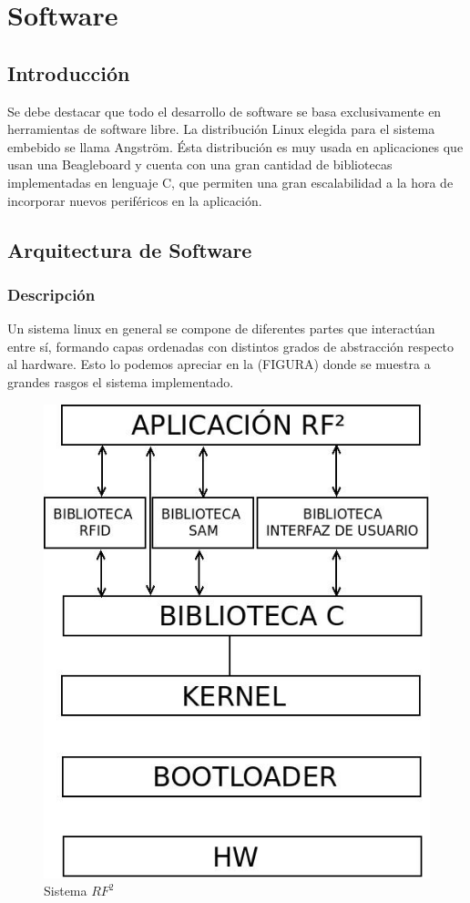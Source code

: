 \chapter{Software}

\section{Introducción}
Se debe destacar que todo el desarrollo de software se basa exclusivamente en herramientas de software libre. La distribución Linux elegida para el sistema embebido se llama Angström. Ésta distribución es muy usada en aplicaciones que usan una Beagleboard y cuenta con una gran cantidad de bibliotecas implementadas en lenguaje C, que permiten una gran escalabilidad a la hora de incorporar nuevos periféricos en la aplicación.

\section{Arquitectura de Software}
\subsection{Descripción}
Un sistema linux en general se compone de diferentes partes que interactúan entre sí, formando capas ordenadas con distintos grados de abstracción respecto al hardware. Esto lo podemos apreciar en la (FIGURA) donde se muestra a grandes rasgos el sistema implementado. 

\begin{figure}[H]
\centering
  \begin{center}
  \includegraphics[scale=.4]{Imagenes/SW.jpg} 
  \end{center}
  \caption{Sistema ${RF^{2}}$}\label{Fig:HW} 
\end{figure}

